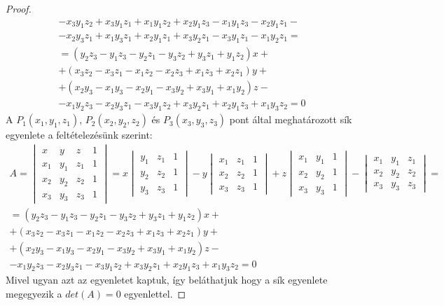 \begin{proof}
\[\begin{array}{c}
		- x_3 y_1 z_2 + x_3 y_1 z_1 + x_1 y_1 z_2 + x_2 y_1 z_3 - x_1 y_1 z_3 - x_2 y_1 z_1 -\\
		- x_2 y_3 z_1 + x_1 y_3 z_1 + x_2 y_1 z_1 + x_3 y_2 z_1 - x_3 y_1 z_1 - x_1 y_2 z_1 =\\
		=(y_2 z_3 - y_1 z_3 - y_2 z_1 - y_3 z_2 + y_3 z_1 + y_1 z_2)x+\\
		+(x_3 z_2 - x_3 z_1 - x_1 z_2 - x_2 z_3 + x_1 z_3 + x_2 z_1)y+\\
		+(x_2 y_3 - x_1 y_3 - x_2 y_1 - x_3 y_2 + x_3 y_1 + x_1 y_2)z-\\
		- x_1 y_2 z_3 - x_2 y_3 z_1 - x_3 y_1 z_2 + x_3 y_2 z_1 + x_2 y_1 z_3  + x_1 y_3 z_2 = 0
	\end{array}
	\]
	A $P_1(x_1, y_1, z_1)$, $P_2(x_2, y_2, z_2)$ és $P_3(x_3, y_3, z_3)$ pont által meghatározott sík egyenlete a feltételezésünk szerint:
	\[
	\begin{array}{c}
		A =
		\begin{vmatrix}
			x & y & z & 1 \\
			x_1 & y_1 & z_1 & 1 \\
			x_2 & y_2 & z_2 & 1 \\
			x_3 & y_3 & z_3 & 1
		\end{vmatrix}
		= x
		\begin{vmatrix}
			y_1 & z_1 & 1 \\
			y_2 & z_2 & 1 \\
			y_3 & z_3 & 1
		\end{vmatrix}
		- y
		\begin{vmatrix}
			x_1 & z_1 & 1 \\
			x_2 & z_2 & 1 \\
			x_3 & z_3 & 1
		\end{vmatrix}
		+ z
		\begin{vmatrix}
			x_1 & y_1 & 1 \\
			x_2 & y_2 & 1 \\
			x_3 & y_3 & 1
		\end{vmatrix}
		-
		\begin{vmatrix}
			x_1 & y_1 & z_1 \\
			x_2 & y_2 & z_2 \\
			x_3 & y_3 & z_3
		\end{vmatrix}
		=\\
		=(y_2 z_3 - y_1 z_3 - y_2 z_1 - y_3 z_2 + y_3 z_1 + y_1 z_2)x+\\
		+(x_3 z_2 - x_3 z_1 - x_1 z_2 - x_2 z_3 + x_1 z_3 + x_2 z_1)y+\\
		+(x_2 y_3 - x_1 y_3 - x_2 y_1 - x_3 y_2 + x_3 y_1 + x_1 y_2)z-\\
		- x_1 y_2 z_3 - x_2 y_3 z_1 - x_3 y_1 z_2 + x_3 y_2 z_1 + x_2 y_1 z_3  + x_1 y_3 z_2 = 0
	\end{array}
	\]
	Mivel ugyan azt az egyenletet kaptuk, így beláthatjuk hogy a sík egyenlete megegyezik a $det(A)=0$ egyenlettel.
\end{proof}


